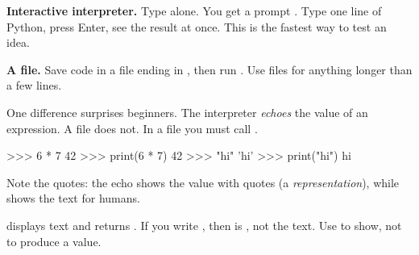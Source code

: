 \begin{center}
\end{center}

\textbf{Interactive interpreter.} Type  alone. You get a prompt
\code{>{}>{}>}. Type one line of Python, press Enter, see the result at once. This is the
fastest way to test an idea.

\textbf{A file.} Save code in a file ending in , then run
. Use files for anything longer than a few lines.

One difference surprises beginners. The interpreter \emph{echoes} the value of an
expression. A file does not. In a file you must call .

\begin{pycode}
>>> 6 * 7
42
>>> print(6 * 7)
42
>>> "hi"
'hi'
>>> print("hi")
hi
\end{pycode}

Note the quotes: the echo shows the value with quotes (a \emph{representation}),
while  shows the text for humans.

\begin{typecheck}
 displays text and returns . If you write
, then  is , not the text. Use 
to show, not to produce a value.
\end{typecheck}


